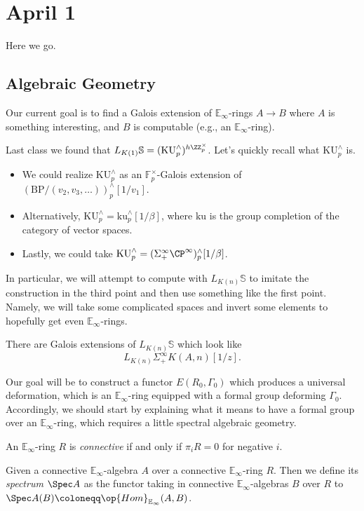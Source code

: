 \documentclass[../notes.tex]{subfiles}
\begin{document}
\section{April 1}
Here we go.

\subsection{Algebraic Geometry}
Our current goal is to find a Galois extension of $\mathbb E_\infty$-rings $A\to B$ where $A$ is something interesting, and $B$ is computable (e.g., an $\mathbb E_\infty$-ring).
\begin{example}
	Last class we found that $L_{K(1)}\mathbb S=(\mathrm{KU}_p^\land)^{h\ZZ_p^\times}$. Let's quickly recall what $\mathrm{KU}^\land_p$ is.
	\begin{itemize}
		\item We could realize $\mathrm{KU}^\land_p$ as an $\mathbb F_p^\times$-Galois extension of $(\mathrm{BP}/(v_2,v_3,\ldots))^\land_p[1/v_1]$.
		\item Alternatively, $\mathrm{KU}_p^\land=\mathrm{ku}^\land_p[1/\beta]$, where $\mathrm{ku}$ is the group completion of the category of vector spaces.
		\item Lastly, we could take $\mathrm{KU}^\land_p=(\Sigma_+^\infty\CP^\infty)^\land_p[1/\beta]$.
	\end{itemize}
\end{example}
In particular, we will attempt to compute with $L_{K(n)}\mathbb S$ to imitate the construction in the third point and then use something like the first point. Namely, we will take some complicated spaces and invert some elements to hopefully get even $\mathbb E_\infty$-rings.
\begin{example}[cyclotomic]
	There are Galois extensions of $L_{K(n)}\mathbb S$ which look like
	\[L_{K(n)}\Sigma_+^\infty K(A,n)[1/z].\]
\end{example}
Our goal will be to construct a functor $E(R_0,\Gamma_0)$ which produces a universal deformation, which is an $\mathbb E_\infty$-ring equipped with a formal group deforming $\Gamma_0$. Accordingly, we should start by explaining what it means to have a formal group over an $\mathbb E_\infty$-ring, which requires a little spectral algebraic geometry.
\begin{definition}[connective]
	An $\mathbb E_\infty$-ring $R$ is \textit{connective} if and only if $\pi_iR=0$ for negative $i$.
\end{definition}
\begin{definition}[spectrum]
	Given a connective $\mathbb E_\infty$-algebra $A$ over a connective $\mathbb E_\infty$-ring $R$. Then we define its \textit{spectrum} $\Spec A$ as the functor taking in connective $\mathbb E_\infty$-algebras $B$ over $R$ to $\Spec A(B)\coloneqq\op{Hom}_{\mathbb E_\infty}(A,B)$.
\end{definition}
\end{document}
